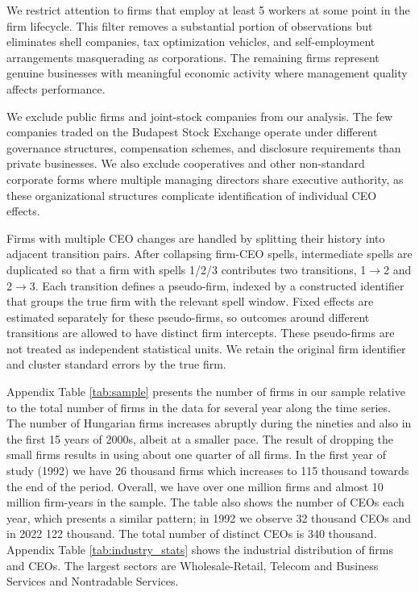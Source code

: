 \documentclass[11pt,a4paper]{article}
\begin{document}
We restrict attention to firms that employ at least 5 workers at some point in the firm lifecycle. This filter removes a substantial portion of observations but eliminates shell companies, tax optimization vehicles, and self-employment arrangements masquerading as corporations. The remaining firms represent genuine businesses with meaningful economic activity where management quality affects performance.

We exclude public firms and joint-stock companies from our analysis. The few companies traded on the Budapest Stock Exchange operate under different governance structures, compensation schemes, and disclosure requirements than private businesses. We also exclude cooperatives and other non-standard corporate forms where multiple managing directors share executive authority, as these organizational structures complicate identification of individual CEO effects.

Firms with multiple CEO changes are handled by splitting their history into adjacent transition pairs. After collapsing firm-CEO spells, intermediate spells are duplicated so that a firm with spells 1/2/3 contributes two transitions, 1$\to$2 and 2$\to$3. Each transition defines a pseudo-firm, indexed by a constructed identifier that groups the true firm with the relevant spell window. Fixed effects are estimated separately for these pseudo-firms, so outcomes around different transitions are allowed to have distinct firm intercepts. These pseudo-firms are not treated as independent statistical units. We retain the original firm identifier and cluster standard errors by the true firm. 

Appendix Table \ref{tab:sample} presents the number of firms in our sample relative to the total number of firms in the data for several year along the time series. The number of Hungarian firms increases abruptly during the nineties and also in the first 15 years of 2000s, albeit at a smaller pace.  The result of dropping the small firms results in using about one quarter of all firms. In the first year of study (1992) we have 26 thousand firms which increases to 115 thousand towards the end of the period. Overall, we have over one million firms and almost 10 million firm-years in the sample. The table also shows the number of CEOs each year, which presents a similar pattern; in 1992 we observe 32 thousand CEOs and in 2022 122 thousand. The total number of distinct CEOs is 340 thousand. Appendix Table \ref{tab:industry_stats} shows the industrial distribution of firms and CEOs. The largest sectors are Wholesale-Retail, Telecom and Business Services and Nontradable Services. 
\end{document}
